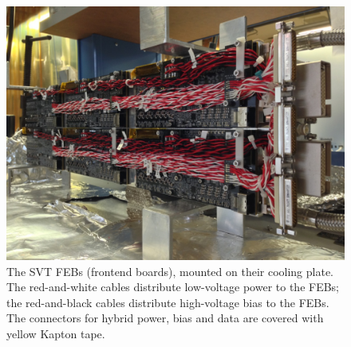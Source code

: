 \begin{figure}[ht]
    \includegraphics[width=\textwidth]{detector/figs/febplate}
    \caption{The SVT FEBs (frontend boards), mounted on their cooling plate. The red-and-white cables distribute low-voltage power to the FEBs; the red-and-black cables distribute high-voltage bias to the FEBs. The connectors for hybrid power, bias and data are covered with yellow Kapton tape.}
    \label{fig:febplate}
\end{figure}

